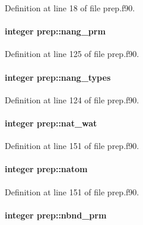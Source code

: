 Definition at line 18 of file prep.\-f90.

\hypertarget{classprep_ac17ec7b95ca0f0ef40679baf2c9c0ae9}{
\paragraph[{nang\-\_\-prm}]{\setlength{\rightskip}{0pt plus 5cm}integer prep\-::nang\-\_\-prm}}\label{classprep_ac17ec7b95ca0f0ef40679baf2c9c0ae9}


Definition at line 125 of file prep.\-f90.

\hypertarget{classprep_a13fc2319ab89b1b88b8fd6a130e08c4e}{
\paragraph[{nang\-\_\-types}]{\setlength{\rightskip}{0pt plus 5cm}integer prep\-::nang\-\_\-types}}\label{classprep_a13fc2319ab89b1b88b8fd6a130e08c4e}


Definition at line 124 of file prep.\-f90.

\hypertarget{classprep_a3d0b820d2bd0a7434096e0de29e2752b}{
\paragraph[{nat\-\_\-wat}]{\setlength{\rightskip}{0pt plus 5cm}integer prep\-::nat\-\_\-wat}}\label{classprep_a3d0b820d2bd0a7434096e0de29e2752b}


Definition at line 151 of file prep.\-f90.

\hypertarget{classprep_ab8dbadaf12262e9ad75d242a9d94a7be}{
\paragraph[{natom}]{\setlength{\rightskip}{0pt plus 5cm}integer prep\-::natom}}\label{classprep_ab8dbadaf12262e9ad75d242a9d94a7be}


Definition at line 151 of file prep.\-f90.

\hypertarget{classprep_a9956f590e2211602a6e5ec0fc78ac75e}{
\paragraph[{nbnd\-\_\-prm}]{\setlength{\rightskip}{0pt plus 5cm}integer prep\-::nbnd\-\_\-prm}}\label{classprep_a9956f590e2211602a6e5ec0fc78ac75e}


